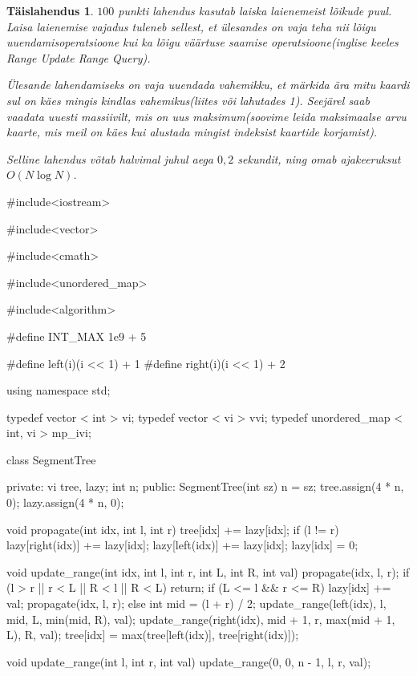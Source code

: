 \documentclass{trkut}
\newtheorem*{solution}{Täislahendus}
\begin{document}
\begin{solution}
$100$ punkti lahendus kasutab laiska laienemeist lõikude puul. 
Laisa laienemise vajadus tuleneb sellest, et ülesandes on vaja teha nii lõigu uuendamisoperatsioone kui ka lõigu väärtuse saamise operatsioone(inglise keeles Range Update Range Query).

Ülesande lahendamiseks on vaja uuendada vahemikku, et märkida ära mitu kaardi sul on käes mingis kindlas vahemikus(liites või lahutades 1).
Seejärel saab vaadata uuesti massiivilt, mis on uus maksimum(soovime leida maksimaalse arvu kaarte, mis meil on käes kui alustada mingist indeksist kaartide korjamist).

Selline lahendus võtab halvimal juhul aega $0,2$ sekundit, ning omab ajakeeruksut $O(N\log N)$.
\end{solution}
\begin{cclol}
#include<iostream>

#include<vector>

#include<cmath>

#include<unordered_map>

#include<algorithm>

#define INT_MAX 1e9 + 5

#define left(i)(i << 1) + 1
#define right(i)(i << 1) + 2

using namespace std;

typedef vector < int > vi;
typedef vector < vi > vvi;
typedef unordered_map < int, vi > mp_ivi;

class SegmentTree {
  private: vi tree,
  lazy;
  int n;
  public: SegmentTree(int sz) {
    n = sz;
    tree.assign(4 * n, 0);
    lazy.assign(4 * n, 0);
  }

  void propagate(int idx, int l, int r) {
    tree[idx] += lazy[idx];
    if (l != r) {
      lazy[right(idx)] += lazy[idx];
      lazy[left(idx)] += lazy[idx];
    }
    lazy[idx] = 0;
  }

  void update_range(int idx, int l, int r, int L, int R, int val) {
    propagate(idx, l, r);
    if (l > r || r < L || R < l || R < L) return;
    if (L <= l && r <= R) {
      lazy[idx] += val;
      propagate(idx, l, r);
    } else {
      int mid = (l + r) / 2;
      update_range(left(idx), l, mid, L, min(mid, R), val);
      update_range(right(idx), mid + 1, r, max(mid + 1, L), R, val);
      tree[idx] = max(tree[left(idx)], tree[right(idx)]);
    }
  }

  void update_range(int l, int r, int val) {
    update_range(0, 0, n - 1, l, r, val);
  }

}
\end{cclol}
\end{document}
